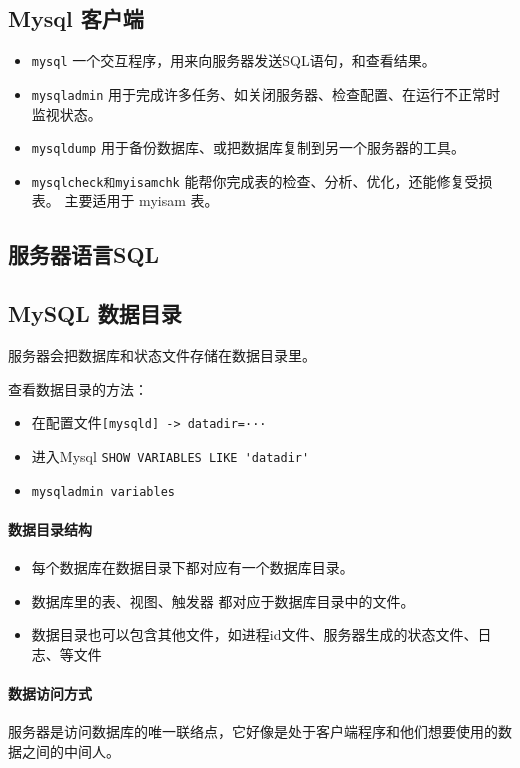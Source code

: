 \documentclass[UTF8,a4paper,12pt]{ctexbook}
\begin{document}
		\subsection{Mysql 客户端}
			\begin{itemize}
				\item \verb|mysql| 一个交互程序，用来向服务器发送SQL语句，和查看结果。
				\item \verb|mysqladmin| 用于完成许多任务、如关闭服务器、检查配置、在运行不正常时监视状态。
				\item \verb|mysqldump| 用于备份数据库、或把数据库复制到另一个服务器的工具。
				\item \verb|mysqlcheck和myisamchk| 能帮你完成表的检查、分析、优化，还能修复受损表。 主要适用于 myisam 表。
			\end{itemize}
		
		\subsection{服务器语言SQL}
		
		\subsection{MySQL 数据目录}
			服务器会把数据库和状态文件存储在数据目录里。 
		
			查看数据目录的方法：
			\begin{itemize}[itemindent = 1em]
				\item 在配置文件\verb|[mysqld] -> datadir=···|
				\item 进入Mysql \verb|SHOW VARIABLES LIKE 'datadir'|
				\item \verb|mysqladmin variables|
			\end{itemize}
			
			\paragraph{数据目录结构}
				\begin{itemize}
					\item 每个数据库在数据目录下都对应有一个数据库目录。
					\item 数据库里的表、视图、触发器 都对应于数据库目录中的文件。
					\item 数据目录也可以包含其他文件，如进程id文件、服务器生成的状态文件、日志、等文件
				\end{itemize}
				
			
			\paragraph{数据访问方式}
				服务器是访问数据库的唯一联络点，它好像是处于客户端程序和他们想要使用的数据之间的中间人。
				
\end{document}
